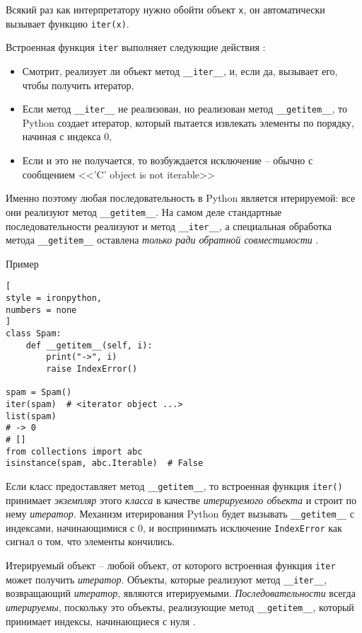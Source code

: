 \documentclass[%
	11pt,
	a4paper,
	utf8,
		]{article}
\begin{document}
Всякий раз как интерпретатору нужно обойти объект \verb*|x|, он автоматически вызывает функцию \verb|iter(x)|.

Встроенная функция \verb*|iter| выполняет следующие действия \cite[]{ramalho:python-2022}:
\begin{itemize}
	\item Смотрит, реализует ли объект метод \verb*|__iter__|, и, если да, вызывает его, чтобы получить итератор,
	
	\item Если метод \verb|__iter__| не реализован, но реализован метод \verb*|__getitem__|, то Python создает итератор, который пытается извлекать элементы по порядку, начиная с индекса 0,
	
	\item Если и это не получается, то возбуждается исключение -- обычно с сообщением <<'C' object is not iterable>>
\end{itemize}

Именно поэтому любая последовательность в Python является итерируемой: все они реализуют метод \verb|__getitem__|. На самом деле стандартные последовательности реализуют и метод \verb*|__iter__|, а специальная обработка метода \verb|__getitem__| оставлена \emph{только ради обратной совместимости} \cite[]{ramalho:python-2022}.

Пример
\begin{lstlisting}[
style = ironpython,
numbers = none
]
class Spam:
    def __getitem__(self, i):
        print("->", i)
        raise IndexError()
        
spam = Spam()
iter(spam)  # <iterator object ...>
list(spam)
# -> 0
# []
from collections import abc
isinstance(spam, abc.Iterable)  # False
\end{lstlisting}

Если класс предоставляет метод \verb*|__getitem__|, то встроенная функция \verb|iter()| принимает \emph{экземпляр} этого \emph{класса} в качестве \emph{итерируемого объекта} и строит по нему \emph{итератор}. Механизм итерирования Python будет вызывать \verb*|__getitem__| с индексами, начинающимися с 0, и воспринимать исключение \verb|IndexError| как сигнал о том, что элементы кончились.

Итерируемый объект -- любой объект, от которого встроенная функция \verb*|iter| может получить \emph{итератор}. Объекты, которые реализуют метод \verb|__iter__|, возвращающий \emph{итератор}, являются итерируемыми. \emph{Последовательности} всегда \emph{итерируемы}, поскольку это объекты, реализующие метод \verb*|__getitem__|, который принимает индексы, начинающиеся с нуля \cite[]{ramalho:python-2022}.
\end{document}
